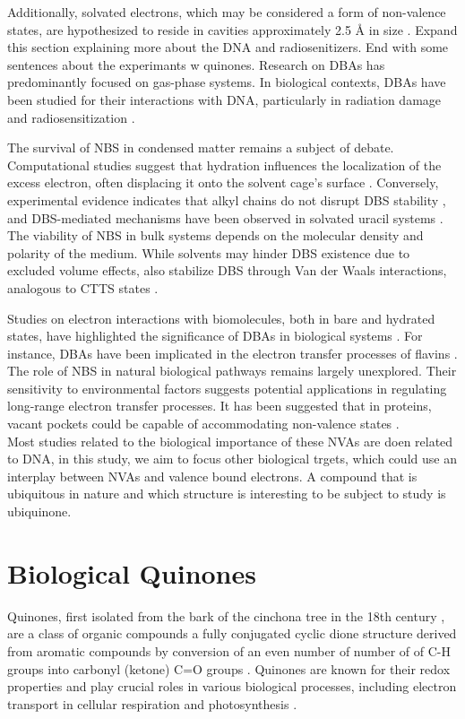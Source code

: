 Additionally, solvated electrons, which may be considered a form of non-valence states, are hypothesized to reside in cavities approximately 2.5 \r{A} in size \cite{herbert2017hydrated}.
Expand this section explaining more about the DNA and radiosenitizers. End with some sentences about the experimants w quinones.
Research on DBAs has predominantly focused on gas-phase systems. In biological contexts, DBAs have been studied for their interactions with DNA, particularly in radiation damage and radiosensitization \cite{narayanan2023secondary,sedmidubska2024interaction}. 

The survival of NBS in condensed matter remains a subject of debate. Computational studies suggest that hydration influences the localization of the excess electron, often displacing it onto the solvent cage's surface \cite{anusiewicz2020fate}. Conversely, experimental evidence indicates that alkyl chains do not disrupt DBS stability \cite{castellani2019stability}, and DBS-mediated mechanisms have been observed in solvated uracil systems \cite{narayanan2024electron}. The viability of NBS in bulk systems depends on the molecular density and polarity of the medium. While solvents may hinder DBS existence due to excluded volume effects, also stabilize DBS through Van der Waals interactions, analogous to CTTS states \cite{bradforth2002excited,chen2000precursors}.

Studies on electron interactions with biomolecules, both in bare and hydrated states, have highlighted the significance of DBAs in biological systems \cite{gu2012interactions}. For instance, DBAs have been implicated in the electron transfer processes of flavins \cite{matthews2018observation}. The role of NBS in natural biological pathways remains largely unexplored. Their sensitivity to environmental factors suggests potential applications in regulating long-range electron transfer processes. It has been suggested that in proteins, vacant pockets could be capable of accommodating non-valence states \cite{castellani2019stability}.\\
Most studies related to the biological importance of these NVAs are doen related to DNA, in this study, we aim to focus other biological trgets, which could use an interplay between NVAs and valence bound electrons. A compound that is ubiquitous in nature and which structure is interesting to be subject to study is ubiquinone.

\section{Biological Quinones}
Quinones, first isolated from the bark of the cinchona tree in the 18th century \cite{rusell1873quinone}, are a class of organic compounds a fully conjugated cyclic dione structure derived from aromatic compounds by conversion of an even number of number of of C-H groups into carbonyl (ketone) C=O groups \cite{IUPACQ050152025}. Quinones are known for their redox properties and play crucial roles in various biological processes, including electron transport in cellular respiration and photosynthesis \cite{ernster1995biochemical,chen2024low}.

